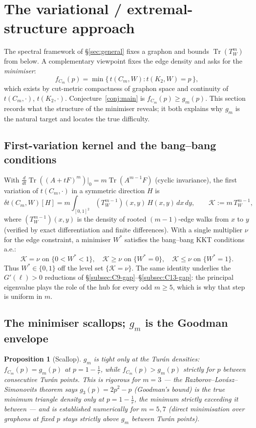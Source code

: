 \documentclass[11pt]{article}
\newtheorem{proposition}[theorem]{Proposition}
\newcommand{\Tr}{\operatorname{Tr}}
\begin{document}
\section{The variational / extremal-structure approach}\label{sec:variational}

The spectral framework of \S\ref{sec:general} fixes a graphon and bounds $\Tr(T_W^m)$ from below.  A complementary viewpoint fixes the edge density and asks for the \emph{minimiser}:
\[
        f_{C_m}(p)=\min\{\,t(C_m,W):t(K_2,W)=p\,\},
\]
which exists by cut-metric compactness of graphon space and continuity of $t(C_m,\cdot)$, $t(K_2,\cdot)$.  Conjecture~\ref{conj:main} is $f_{C_m}(p)\ge g_m(p)$.  This section records what the structure of the minimiser reveals; it both explains why $g_m$ is the natural target and locates the true difficulty.

\subsection{First-variation kernel and the bang--bang conditions}

With $\tfrac{d}{dt}\Tr((A+tF)^m)|_0=m\Tr(A^{m-1}F)$ (cyclic invariance), the first variation of $t(C_m,\cdot)$ in a symmetric direction $H$ is
\begin{equation}\label{eq:first-variation-Cm}
        \delta t(C_m,W)[H]=m\!\int_{[0,1]^2}\!(T_W^{m-1})(x,y)\,H(x,y)\,dx\,dy,
        \qquad \mathcal K:=m\,T_W^{m-1},
\end{equation}
where $(T_W^{m-1})(x,y)$ is the density of rooted $(m-1)$-edge walks from $x$ to $y$ (verified by exact differentiation and finite differences).  With a single multiplier $\nu$ for the edge constraint, a minimiser $W^*$ satisfies the bang--bang KKT conditions a.e.:
\[
        \mathcal K=\nu \text{ on } \{0<W^*<1\},\quad
        \mathcal K\ge\nu \text{ on } \{W^*=0\},\quad
        \mathcal K\le\nu \text{ on } \{W^*=1\}.
\]
Thus $W^*\in\{0,1\}$ off the level set $\{\mathcal K=\nu\}$.  The same identity underlies the $G'(\ell)>0$ reductions of \S\ref{subsec:C9-gap}--\S\ref{subsec:C13-gap}: the principal eigenvalue plays the role of the hub for every odd $m\ge5$, which is why that step is uniform in $m$.

\subsection{The minimiser scallops; $g_m$ is the Goodman envelope}\label{subsec:scallop}

\begin{proposition}[Scallop]\label{prop:scallop}
$g_m$ is tight only at the Tur\'an densities: $f_{C_m}(p)=g_m(p)$ at $p=1-\tfrac1r$, while $f_{C_m}(p)>g_m(p)$ strictly for $p$ between consecutive Tur\'an points.  This is rigorous for $m=3$ --- the Razborov--Lov\'asz--Simonovits theorem says $g_3(p)=2p^2-p$ (Goodman's bound) is the true minimum triangle density only at $p=1-\tfrac1r$, the minimum strictly exceeding it between --- and is established numerically for $m=5,7$ (direct minimisation over graphons at fixed $p$ stays strictly above $g_m$ between Tur\'an points).
\end{proposition}
\end{document}
